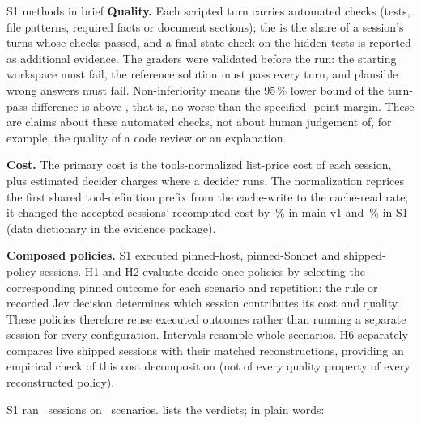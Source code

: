 \begin{casecard}{S1 methods in brief}
\textbf{Quality.} Each scripted turn carries automated checks (tests, file patterns, required facts or document
sections); the  is the share of a session's turns whose checks passed, and a final-state check
on the hidden tests is reported as additional evidence. The graders were validated before the run: the starting
workspace must fail, the reference solution must pass every turn, and plausible wrong answers must fail.
Non-inferiority means the 95\,\% lower bound of the turn-pass difference is above \NIMargin, that is, no worse than the
specified \NIMarginPts-point margin. These are claims about these automated checks, not about human judgement of, for
example, the quality of a code review or an explanation.

\textbf{Cost.} The primary cost is the tools-normalized list-price cost of each session, plus estimated decider charges
where a decider runs. The normalization reprices the first shared tool-definition prefix from the cache-write to the
cache-read rate; it changed the accepted sessions' recomputed cost by \NormShareMain\,\% in main-v1 and \NormShareSone\,\%
in S1 (data dictionary in the evidence package).

\textbf{Composed policies.} S1 executed pinned-host, pinned-Sonnet and shipped-policy sessions. H1 and H2 evaluate
decide-once policies by selecting the corresponding pinned outcome for each scenario and repetition: the rule or recorded
Jev decision determines which session contributes its cost and quality. These policies therefore reuse executed outcomes
rather than running a separate session for every configuration. Intervals resample whole scenarios. H6 separately
compares live shipped sessions with their matched reconstructions, providing an empirical check of this cost
decomposition (not of every quality property of every reconstructed policy).
\end{casecard}

\ifnum{}
S1 ran \SOneSessions\ sessions on \SOneScen\ scenarios.  lists the verdicts; in plain words:
